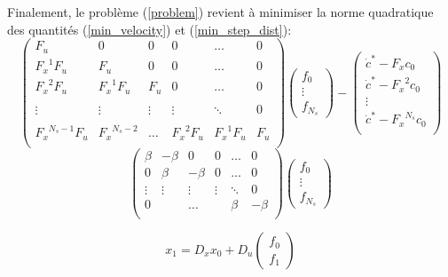 \documentclass[10pt,a4paper]{article}
\begin{document}
Finalement, le problème (\ref{problem}) revient à minimiser la norme quadratique des quantités (\ref{min_velocity}) et (\ref{min_step_dist}):
\begin{equation}\label{min_velocity}
\begin{pmatrix} 
 F_u        		& 0 	 		& 0 &0& \hdots & 0 \\
 {F_x}^1 F_u 		& F_u 	 		& 0 &0& \hdots & 0 \\
 {F_x}^2 F_u 		& {F_x}^1 F_u 	& F_u &0& \hdots & 0 \\ \\
 \vdots	 			&\vdots 	& \vdots & \vdots &  \ddots & 0 \\ \\
 {F_x}^{N_s-1} F_u 	&  {F_x}^{N_s-2}	& \hdots& {F_x}^2 F_u& {F_x}^1 F_u  & F_u \\
\end{pmatrix}\begin{pmatrix} 
f_0 \\
\vdots \\
f_{N_s}
\end{pmatrix} - \begin{pmatrix} 
\dot{c}^*-{F_x} c_0\\
\dot{c}^*-{F_x}^2 c_0\\
\vdots \\
\dot{c}^*-{F_x}^{N_s} c_0\\
\end{pmatrix}
\end{equation}
\begin{equation}\label{min_step_dist}
\begin{pmatrix} 
 \beta    & -\beta 	 	& 0 &0& \hdots & 0 \\
 0&\beta    & -\beta 	 	& 0 & \hdots & 0 \\
 \vdots	 			&\vdots 	& \vdots & \vdots &  \ddots & 0 \\ 
 0       		&  	 		&    \hdots&  & \beta    & -\beta \\
\end{pmatrix}
\begin{pmatrix} 
f_0 \\
\vdots \\
f_{N_s}
\end{pmatrix}
\end{equation}


\begin{equation}
x_1=D_xx_0+D_u\begin{pmatrix} f_0 \\ f_1 \end{pmatrix}
\end{equation}
\end{document}
